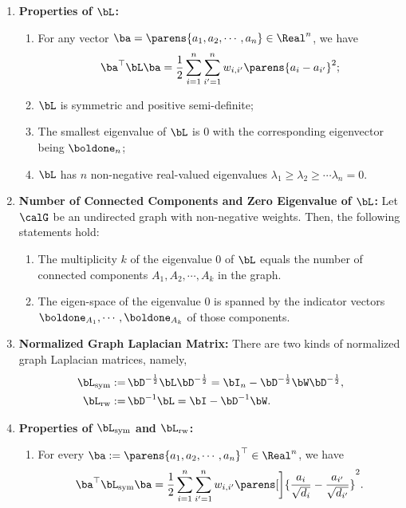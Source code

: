 \documentclass[12pt]{article}
\begin{document}
\begin{enumerate}[label=\textbf{\arabic*.}]
	\item \textbf{Properties of $\bL$:}
	\begin{enumerate}
		\item For any vector $\ba = \parens{a_1, a_2, \cdots, a_n} \in \Real^n$, we have 
		\begin{align*}
			\ba^\top \bL \ba = \frac{1}{2} \sum_{i=1}^n \sum_{i'=1}^n w_{i, i'} \parens{a_i - a_{i'}}^2; 
		\end{align*}
		\item $\bL$ is symmetric and positive semi-definite; 
		\item The smallest eigenvalue of $\bL$ is 0 with the corresponding eigenvector being $\boldone_n$; 
		\item $\bL$ has $n$ non-negative real-valued eigenvalues $\lambda_1 \ge \lambda_2 \ge \cdots \lambda_n = 0$. 
	\end{enumerate}
	
	
	\item \textbf{Number of Connected Components and Zero Eigenvalue of $\bL$:} Let $\calG$ be an undirected graph with non-negative weights. Then, the following statements hold: 
	\begin{enumerate}
		\item The multiplicity $k$ of the eigenvalue 0 of $\bL$ equals the number of connected components $A_1, A_2, \cdots, A_k$ in the graph. 
		\item The eigen-space of the eigenvalue 0 is spanned by the indicator vectors $\boldone_{A_1}, \cdots, \boldone_{A_k}$ of those components. 
	\end{enumerate}
	
	\item \textbf{Normalized Graph Laplacian Matrix:} There are two kinds of normalized graph Laplacian matrices, namely, 
	\begin{align}
		\bL_{\mathrm{sym}} := & \, \bD^{-\frac{1}{2}} \bL \bD^{-\frac{1}{2}} = \bI_n - \bD^{-\frac{1}{2}} \bW \bD^{-\frac{1}{2}}, \\ 
		\bL_{\mathrm{rw}} := & \, \bD^{-1} \bL = \bI - \bD^{-1} \bW. 
	\end{align}
	
	\item \textbf{Properties of $\bL_{\mathrm{sym}}$ and $\bL_{\mathrm{rw}}$:}
	\begin{enumerate}
		\item For every $\ba := \parens{a_1, a_2, \cdots, a_n}^\top \in \Real^n$, we have 
		\begin{align*}
			\ba^\top \bL_{\mathrm{sym}} \ba = \frac{1}{2} \sum_{i=1}^n \sum_{i'=1}^n w_{i, i'} \parens[\bigg]{\frac{a_i}{\sqrt{d_i}} - \frac{a_{i'}}{\sqrt{d_{i'}}}}^2. 
		\end{align*}
		

\end{enumerate}
\end{enumerate}
\end{document}
